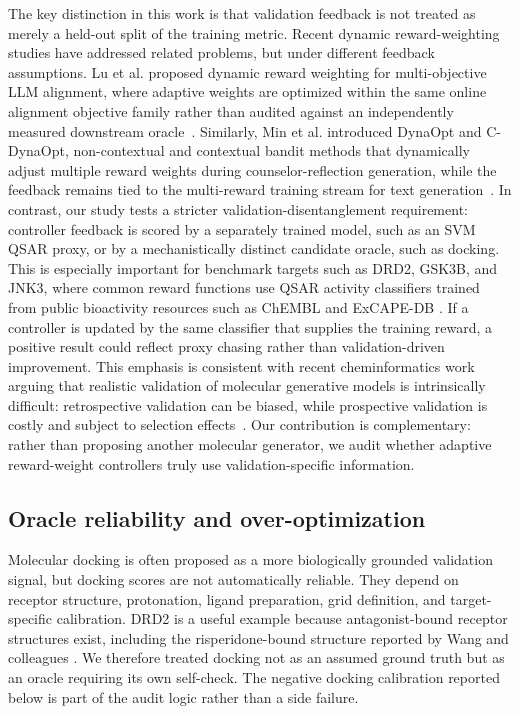 \documentclass[referee,lineno,pdflatex,sn-basic]{sn-jnl}
\theoremstyle{thmstyleone}%
\theoremstyle{thmstyletwo}%
\theoremstyle{thmstylethree}%
\begin{document}
The key distinction in this work is that validation feedback is not treated as merely
a held-out split of the training metric. Recent dynamic reward-weighting studies
have addressed related problems, but under different feedback assumptions. Lu et al.
proposed dynamic reward weighting for multi-objective LLM alignment, where adaptive
weights are optimized within the same online alignment objective family rather than
audited against an independently measured downstream oracle~\cite{lu2026dynamicreward}.
Similarly, Min et al. introduced DynaOpt and C-DynaOpt, non-contextual and contextual
bandit methods that dynamically adjust multiple reward weights during counselor-reflection
generation, while the feedback remains tied to the multi-reward training stream for
text generation~\cite{min2024dynaopt}. In contrast, our study tests a stricter
validation-disentanglement requirement: controller feedback is scored by a separately
trained model, such as an SVM QSAR proxy, or by a mechanistically distinct candidate
oracle, such as docking. This is especially important for benchmark targets such as DRD2, GSK3B, and JNK3, where common reward functions use QSAR activity classifiers trained from public bioactivity resources such as ChEMBL and ExCAPE-DB \cite{ref-chembl,ref-excape}. If a controller is updated by the same classifier that supplies the training reward, a positive result could reflect proxy chasing rather than validation-driven improvement. This emphasis is consistent with recent cheminformatics work arguing that
realistic validation of molecular generative models is intrinsically difficult:
retrospective validation can be biased, while prospective validation is costly and
subject to selection effects~\cite{handa2023difficulty}. Our contribution is
complementary: rather than proposing another molecular generator, we audit whether
adaptive reward-weight controllers truly use validation-specific information.

\subsection{Oracle reliability and over-optimization}\label{subsec:rw_oracle}

Molecular docking is often proposed as a more biologically grounded validation signal, but docking scores are not automatically reliable. They depend on receptor structure, protonation, ligand preparation, grid definition, and target-specific calibration. DRD2 is a useful example because antagonist-bound receptor structures exist, including the risperidone-bound structure reported by Wang and colleagues \cite{ref-drd2-structure}. We therefore treated docking not as an assumed ground truth but as an oracle requiring its own self-check. The negative docking calibration reported below is part of the audit logic rather than a side failure.
\end{document}
